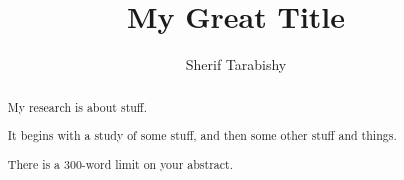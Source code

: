 \makeatletter
\renewcommand {\@degree@string} {Master of Science}
\makeatother
\makeatletter
\renewcommand {\@course@title} {Architectural Computation}
\makeatother
\makeatletter
\renewcommand {\@course@title@preposition} {in}
\makeatother


\title{My Great Title}
\author{Sherif Tarabishy}

\extradeclaration{}

\maketitle
\makedeclaration

\begin{abstract} %
    My research is about stuff.

    It begins with a study of some stuff, and then some other stuff and things.

    There is a 300-word limit on your abstract.
\end{abstract}


